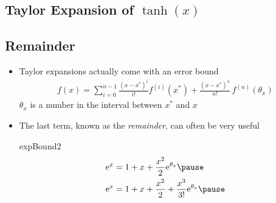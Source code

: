 
\begin{slide}
\section[-1]{Taylor Expansion of $\tanh(x)$}

\pause{}
\pb
\begin{center}
  \pause
\end{center}
\end{slide}


\begin{slide}
\section[-2]{Remainder}

\begin{PauseHighLight}
  \begin{itemize}
  \item Taylor expansions actually come with an error bound
    \begin{align*}
      f(x) = \sum_{i=0}^{n-1} \frac{(x-x^*)^i}{i!} f^{(i)}(x^*) +
      \frac{(x-x^*)^n}{n!} \, f^{(n)}(\theta_x)
    \end{align*}
    $\theta_x$ is a number in the interval between $x^*$ and $x$\pause
  \item The last term, known as the \emph{remainder}, can often be very useful
    \begin{rightImage}[0.3]{expBound2}
        \begin{align*}
          \e{x} &= 1 + x + \frac{x^2}{2}\e{\theta_x}\pause\\
          \e{x} &= 1 + x + \frac{x^2}{2} + \frac{x^3}{3!} \e{\theta_x}\pause
        \end{align*}
    \end{rightImage}
  \end{itemize}
\end{PauseHighLight}

\end{slide}


